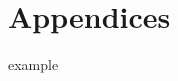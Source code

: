 \appendix
\markboth{}{}      
\extramarks{}{} 


\part{Appendices}
\label{part:appendices}

{example}

